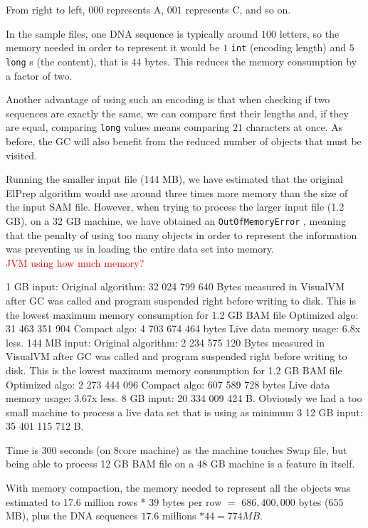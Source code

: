 \documentclass[a4paper,twoside]{article}
\begin{document}
From right to left, $000$ represents A, $001$ represents C, and so on.

In the sample files, one DNA sequence is typically around $100$ letters, so the memory needed in order to represent it would be $1$ {\texttt{int} } (encoding length) and $5$ {\texttt{long} }s (the content), that is $44$ bytes.
This reduces the memory consumption by a factor of two.

Another advantage of using such an encoding is that when checking if two sequences are exactly the same, we can compare first their lengths and, if they are equal, comparing {\texttt{long} } values means comparing $21$ characters at once.
As before, the GC will also benefit from the reduced number of objects that must be visited.




Running the smaller input file (144 MB), we have estimated that the original ElPrep algorithm would use around three times more memory than the size of the input SAM file.
However, when trying to process the larger input file (1.2 GB), on a 32 GB machine, we have obtained an {\texttt{OutOfMemoryError} }, meaning that the penalty of using too many objects in order to represent the information was preventing us in loading the entire data set into memory.
\\ \textcolor{red}{JVM using how much memory?}

1 GB input:
Original algorithm: 32 024 799 640 Bytes measured in VisualVM after GC was called and program suspended right before writing to disk.
This is the lowest maximum memory consumption for 1.2 GB BAM file
Optimized algo: 31 463 351 904
Compact algo: 4 703 674 464 bytes	
Live data memory usage: 6.8x less.
144 MB input:
Original algorithm: 2 234 575 120 Bytes measured in VisualVM after GC was called and program suspended right before writing to disk.
This is the lowest maximum memory consumption for 1.2 GB BAM file
Optimized algo: 2 273 444 096
Compact algo: 607 589 728 bytes	
Live data memory usage: 3.67x less.
8 GB input: 20 334 009 424 B\@.
Obviously we had a too small machine to process a live data set that is using as minimum 3
12 GB input: 35 401 115 712 B\@.

Time is 300 seconds (on 8core machine) as the machine touches Swap file, but being able to process 12 GB BAM file on a 48 GB machine is a feature in itself.


With memory compaction, the memory needed to represent all the objects was estimated to 17.6 million rows * $39$ bytes per row $=$ $686,400,000$ bytes ($655$ MB), plus the DNA sequences  $17.6$ millions $* 44 = 774 MB$.
\end{document}
